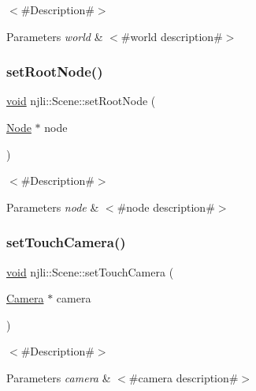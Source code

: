 $<$\#\+Description\#$>$


\begin{DoxyParams}{Parameters}
{\em world} & $<$\#world description\#$>$ \\
\hline
\end{DoxyParams}
\mbox{\label{classnjli_1_1_scene_a3118fbf195018c52cc493efdec177f9e}} 
\subsubsection{\texorpdfstring{set\+Root\+Node()}{setRootNode()}}
{\footnotesize\ttfamily \mbox{\hyperlink{_thread_8h_af1e856da2e658414cb2456cb6f7ebc66}{void}} njli\+::\+Scene\+::set\+Root\+Node (\begin{DoxyParamCaption}\item[{\mbox{\hyperlink{classnjli_1_1_node}{Node}} $\ast$}]{node }\end{DoxyParamCaption})}

$<$\#\+Description\#$>$


\begin{DoxyParams}{Parameters}
{\em node} & $<$\#node description\#$>$ \\
\hline
\end{DoxyParams}
\mbox{\label{classnjli_1_1_scene_a4a926234963cc9b8f14928e559dbd82f}} 
\subsubsection{\texorpdfstring{set\+Touch\+Camera()}{setTouchCamera()}}
{\footnotesize\ttfamily \mbox{\hyperlink{_thread_8h_af1e856da2e658414cb2456cb6f7ebc66}{void}} njli\+::\+Scene\+::set\+Touch\+Camera (\begin{DoxyParamCaption}\item[{\mbox{\hyperlink{classnjli_1_1_camera}{Camera}} $\ast$}]{camera }\end{DoxyParamCaption})}

$<$\#\+Description\#$>$


\begin{DoxyParams}{Parameters}
{\em camera} & $<$\#camera description\#$>$ \\
\hline
\end{DoxyParams}
\mbox{\label{classnjli_1_1_scene_adfa4d5941916d1716d9015a22a5976dc}} 
